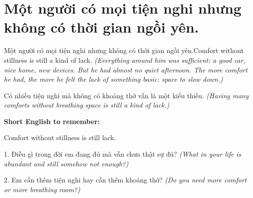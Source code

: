 \section{Một người có mọi tiện nghi nhưng không có thời gian ngồi yên.}
\begin{truyen}{Một người có mọi tiện nghi nhưng không có thời gian ngồi yên.}{Comfort without stillness is still a kind of lack.}
\textit{(Everything around him was sufficient: a good car, nice home, new devices. But he had almost no quiet afternoon. The more comfort he had, the more he felt the lack of something basic: space to slow down.)}
\end{truyen}
\begin{baihoc}
Có nhiều tiện nghi mà không có khoảng thở vẫn là một kiểu thiếu.
\textit{(Having many comforts without breathing space is still a kind of lack.)}
\end{baihoc}
\begin{ghinhoanh}
\textbf{Short English to remember:}

Comfort without stillness is still lack.
\end{ghinhoanh}
\begin{tuhocnhanh}
1. Điều gì trong đời em đang đủ mà vẫn chưa thật sự đủ? \textit{(What in your life is abundant and still somehow not enough?)}

2. Em cần thêm tiện nghi hay cần thêm khoảng thở? \textit{(Do you need more comfort or more breathing room?)}
\end{tuhocnhanh}
\ngancach